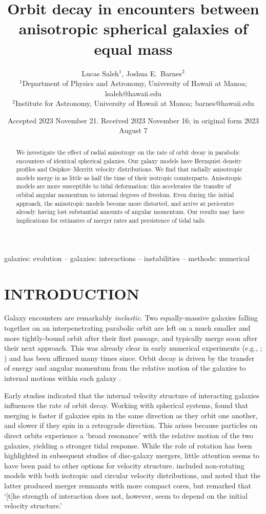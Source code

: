 \documentclass[fleqn,usenatbib]{mnras}
\title[Encounters between anisotropic galaxies]{Orbit decay in encounters between anisotropic spherical galaxies of equal mass}
\author[L. Saleh \& J. E. Barnes]{Lucas Saleh$^1$, Joshua E.~Barnes$^2$
\\
$^1$Department of Physics and Astronomy, University of Hawaii at Manoa; \textsf{lsaleh@hawaii.edu}\\
$^2$Institute for Astronomy, University of Hawaii at Manoa; \textsf{barnes@hawaii.edu}}
\date{Accepted 2023 November 21. Received 2023 November 16; in original form 2023 August 7}
\begin{document}
\label{firstpage}
\pagerange{\pageref{firstpage}--\pageref{lastpage}}
\maketitle

\begin{abstract}
\noindent We investigate the effect of radial anisotropy on the rate of orbit decay in parabolic encounters of identical spherical galaxies. Our galaxy models have Hernquist density profiles and Osipkov--Merritt velocity distributions. We find that radially anisotropic models merge in as little as half the time of their isotropic counterparts. Anisotropic models are more susceptible to tidal deformation; this accelerates the transfer of orbital angular momentum to internal degrees of freedom. Even during the initial approach, the anisotropic models become more distorted, and arrive at pericentre already having lost substantial amounts of angular momentum. Our results may have implications for estimates of merger rates and persistence of tidal tails.
\end{abstract}

\vspace{0.5in}

\begin{keywords}
galaxies: evolution -- galaxies: interactions -- instabilities -- methods: numerical
\end{keywords}

\section{INTRODUCTION}
\label{introduction}
Galaxy encounters are remarkably \textit{inelastic}. Two equally-massive galaxies falling together on an interpenetrating parabolic orbit are left on a much smaller and more tightly-bound orbit after their first passage, and typically merge soon after their next approach. This was already clear in early numerical experiments (e.g., \citealt{VV1977}; \citealt{White1978}) and has been affirmed many times since. Orbit decay is driven by the transfer of energy and angular momentum from the relative motion of the galaxies to internal motions within each galaxy \citep[Ch.~8]{BT2008}. 

Early studies indicated that the internal velocity structure of interacting galaxies influences the rate of orbit decay. Working with spherical systems, \cite{White1979} found that merging is faster if galaxies spin in the same direction as they orbit one another, and slower if they spin in a retrograde direction. This arises because particles on direct orbits experience a `broad resonance' \citep{TT1972} with the relative motion of the two galaxies, yielding a stronger tidal response. While the role of rotation has been highlighted in subsequent studies of disc-galaxy mergers, little attention seems to have been paid to other options for velocity structure. \cite{White1979} included non-rotating models with both isotropic and circular velocity distributions, and noted that the latter produced merger remnants with more compact cores, but remarked that `[t]he strength of interaction does not, however, seem to depend on the initial velocity structure.'
\end{document}
